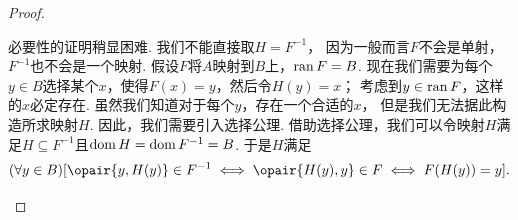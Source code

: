 \begin{theorem}
\begin{proof}
\begin{enumerate}
	必要性的证明稍显困难.
	我们不能直接取\(H = F^{-1}\)，
	因为一般而言\(F\)不会是单射，
	\(F^{-1}\)也不会是一个映射.
	假设\(F\)将\(A\)映射到\(B\)上，\(\operatorname{ran} F = B\).
	现在我们需要为每个\(y \in B\)选择某个\(x\)，使得\(F(x) = y\)，然后令\(H(y) = x\)；
	考虑到\(y \in \operatorname{ran} F\)，这样的\(x\)必定存在.
	虽然我们知道对于每个\(y\)，存在一个合适的\(x\)，
	但是我们无法据此构造所求映射\(H\).
	因此，我们需要引入选择公理.
	借助选择公理，我们可以令映射\(H\)满足\(H \subseteq F^{-1}\)且\(\operatorname{dom} H = \operatorname{dom} F^{-1} = B\).
	于是\(H\)满足\begin{equation*}
		(\forall y \in B)
		[
			\opair{y,H(y)} \in F^{-1}
			\iff
			\opair{H(y),y} \in F
			\iff
			F(H(y)) = y
		].
		\qedhere
	\end{equation*}
\end{enumerate}
\end{proof}
\end{theorem}

